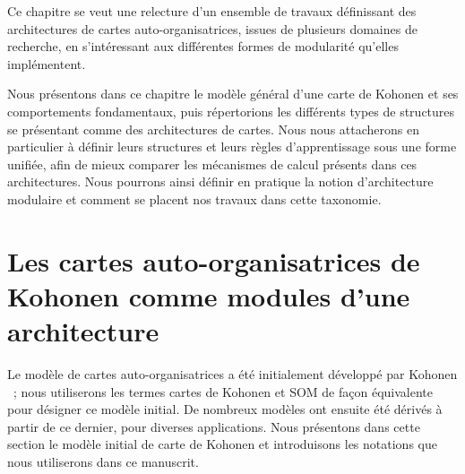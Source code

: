 \documentclass[../main]{subfiles}
\begin{document}
Ce chapitre se veut une relecture d'un ensemble de travaux définissant des architectures de cartes auto-organisatrices, issues de plusieurs domaines de recherche, en s'intéressant aux différentes formes de modularité qu'elles implémentent.

Nous présentons dans ce chapitre le modèle général d'une carte de Kohonen et ses comportements fondamentaux, puis répertorions les différents types de structures se présentant comme des architectures de cartes. 
Nous nous attacherons en particulier à définir leurs structures et leurs règles d'apprentissage sous une forme unifiée, afin de mieux comparer les mécanismes de calcul présents dans ces architectures.
Nous pourrons ainsi définir en pratique la notion d'architecture modulaire et comment se placent nos travaux dans cette taxonomie.

\section{Les cartes auto-organisatrices de Kohonen comme modules d'une architecture}\label{sec:som001}

Le modèle de cartes auto-organisatrices a été initialement développé par Kohonen \parencite{Kohonen1982}~; nous utiliserons les termes cartes de Kohonen et SOM de façon équivalente pour désigner ce modèle initial.
De nombreux modèles ont ensuite été dérivés à partir de ce dernier, pour diverses applications.
Nous présentons dans cette section le modèle initial de carte de Kohonen et introduisons les notations que nous utiliserons dans ce manuscrit.
\end{document}
